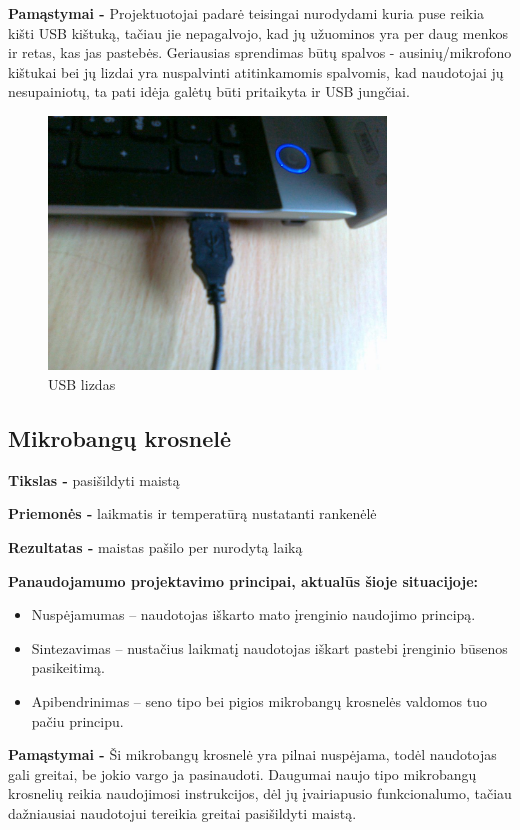﻿\documentclass[a4paper, 12pt]{article}
\begin{document}
		\textbf{Pamąstymai -}
		Projektuotojai padarė teisingai nurodydami kuria puse reikia kišti USB kištuką, tačiau jie nepagalvojo, kad jų užuominos yra per daug menkos ir retas, kas jas pastebės. 
		Geriausias sprendimas būtų spalvos - ausinių/mikrofono kištukai bei jų lizdai yra nuspalvinti atitinkamomis spalvomis, kad naudotojai jų nesupainiotų, ta pati idėja galėtų būti pritaikyta ir USB jungčiai.
		
		\begin{figure}[h]
		\centering
		\includegraphics[width=0.8\textwidth]{usb.JPG}
		\caption{USB lizdas}
		\label{overflow}
		\end{figure}
	\subsection{Mikrobangų krosnelė}
		\textbf{Tikslas -}
		pasišildyti maistą

		\textbf{Priemonės -} 
		laikmatis ir temperatūrą nustatanti rankenėlė

		\textbf{Rezultatas -}
		maistas pašilo per nurodytą laiką

		\textbf{Panaudojamumo projektavimo principai, aktualūs šioje situacijoje:}
		\begin{itemize}
		\item Nuspėjamumas – naudotojas iškarto mato įrenginio naudojimo principą.	
		\item Sintezavimas – nustačius laikmatį naudotojas iškart pastebi įrenginio būsenos pasikeitimą.
		\item Apibendrinimas – seno tipo bei pigios mikrobangų krosnelės valdomos tuo pačiu principu.
		\end{itemize}

		\textbf{Pamąstymai -}
		Ši mikrobangų krosnelė yra pilnai nuspėjama, todėl naudotojas gali greitai, be jokio vargo ja pasinaudoti. 
		Daugumai naujo tipo mikrobangų krosnelių reikia naudojimosi instrukcijos, dėl jų įvairiapusio funkcionalumo, tačiau dažniausiai naudotojui tereikia greitai pasišildyti maistą.	
\end{document}
